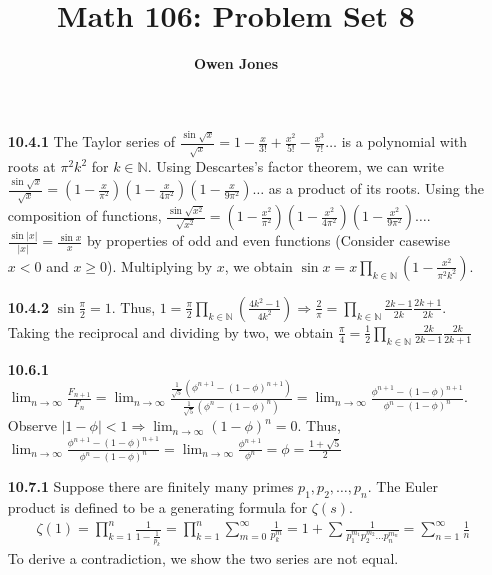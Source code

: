 \documentclass[10pt]{article}
\title{\bf Math 106: Problem Set 8}
\author{\bf Owen Jones}
\begin{document}
\maketitle
\begin{enumerate}
    \item [\textbf{10.4.1}] The Taylor series of $\frac{\sin\sqrt{x}}{\sqrt{x}}=1-\frac{x}{3!}+\frac{x^2}{5!}-\frac{x^3}{7!}\ldots$ is a polynomial with roots at $\pi^2 k^2$ for $k\in\mathbb{N}$.
    Using Descartes's factor theorem, we can write $\frac{\sin\sqrt{x}}{\sqrt{x}}=(1-\frac{x}{\pi^2})(1-\frac{x}{4\pi^2})(1-\frac{x}{9\pi^2})\ldots$ as a product of its roots.
    Using the composition of functions, $\frac{\sin\sqrt{x^2}}{\sqrt{x^2}}=(1-\frac{x^2}{\pi^2})(1-\frac{x^2}{4\pi^2})(1-\frac{x^2}{9\pi^2})\ldots$. 
    $\frac{\sin\lvert x\rvert}{\lvert x\rvert}=\frac{\sin x}{x}$ by properties of odd and even functions (Consider casewise $x<0$ and $x\ge 0$). 
    Multiplying by $x$, we obtain $\displaystyle \sin x=x\prod_{k\in\mathbb{N}}(1-\frac{x^2}{\pi^2 k^2})$.
    \item [\textbf{10.4.2}] $\sin\frac{\pi}{2}=1$. 
    Thus, $\displaystyle 1=\frac{\pi}{2}\prod_{k\in\mathbb{N}}(\frac{4k^2-1}{ 4k^2})\Rightarrow \frac{2}{\pi}=\prod_{k\in\mathbb{N}}\frac{2k-1}{2k}\frac{2k+1}{2k}$. 
    Taking the reciprocal and dividing by two, we obtain $\frac{\pi}{4}=\frac{1}{2}\prod_{k\in\mathbb{N}}\frac{2k}{2k-1}\frac{2k}{2k+1}$
    \item [\textbf{10.6.1}] $\displaystyle \lim_{n\rightarrow\infty}\frac{F_{n+1}}{F_n}=\lim_{n\rightarrow\infty}\frac{\frac{1}{\sqrt{5}}(\phi^{n+1}-{(1-\phi)}^{n+1})}{\frac{1}{\sqrt{5}}(\phi^{n}-{(1-\phi)}^{n})}=\lim_{n\rightarrow\infty}\frac{\phi^{n+1}-{(1-\phi)}^{n+1}}{\phi^{n}-{(1-\phi)}^{n}}$. 
    Observe $\displaystyle\lvert 1-\phi\rvert<1\Rightarrow \lim_{n\rightarrow\infty}{(1-\phi)}^{n}=0$.
    Thus, $\displaystyle\lim_{n\rightarrow\infty}\frac{\phi^{n+1}-{(1-\phi)}^{n+1}}{\phi^{n}-{(1-\phi)}^{n}}=\lim_{n\rightarrow\infty}\frac{\phi^{n+1}}{\phi^{n}}=\phi=\frac{1+\sqrt{5}}{2}$
    \item [\textbf{10.7.1}] Suppose there are finitely many primes $p_1,p_2,\ldots,p_n$. 
    The Euler product is defined to be a generating formula for $\zeta(s)$.
    \begin{align*}
        &\zeta(1)=\prod_{k=1}^{n}\frac{1}{1-\frac{1}{p_k}}=\prod_{k=1}^{n}\sum_{m=0}^{\infty}\frac{1}{p_k^m}=1+\sum\frac{1}{p_1^{m_1}p_2^{m_2}\ldots p_n^{m_n}}=\sum_{n=1}^{\infty}\frac{1}{n}
    \end{align*}
    To derive a contradiction, we show the two series are not equal.\\

\end{enumerate}
\end{document}
